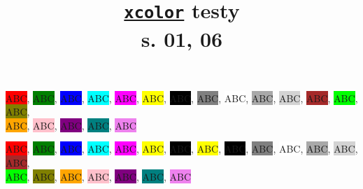 \documentclass[a4paper,11pt]{article}
\title{\href{https://repo.skni.umcs.pl/ctan/macros/latex/contrib/xcolor/xcolor.pdf}{\texttt{xcolor}} testy \\
  s. 01, 06}
\author{}
\begin{document}





\maketitle %





\noindent
\color{black}
\colorbox{red}{ABC},
\colorbox{green}{ABC},
\colorbox{blue}{ABC},
\colorbox{cyan}{ABC},
\colorbox{magenta}{ABC},
\colorbox{yellow}{ABC},
\color{white} \colorbox{black}{ABC}, \color{black}
\colorbox{gray}{ABC},
\colorbox{white}{ABC},
\colorbox{darkgray}{ABC},
\colorbox{lightgray}{ABC},
\colorbox{brown}{ABC},
\colorbox{lime}{ABC},
\colorbox{olive}{ABC}, \\[0.5em]
\colorbox{orange}{ABC},
\colorbox{pink}{ABC},
\colorbox{purple}{ABC},
\colorbox{teal}{ABC},
\colorbox{violet}{ABC}

\vspace{1em}





\begingroup

\color{black}


\noindent
\colorbox{red}{ABC},
\colorbox{green}{ABC},
\colorbox{blue}{ABC},
\colorbox{cyan}{ABC},
\colorbox{magenta}{ABC},
\colorbox{yellow}{ABC},
\colorbox{black}{ABC},
\colorbox{yellow}{ABC},
\colorbox{black}{ABC},
\colorbox{gray}{ABC},
\colorbox{white}{ABC},
\colorbox{darkgray}{ABC},
\colorbox{lightgray}{ABC},
\colorbox{brown}{ABC}, \\[0.5em]
\colorbox{lime}{ABC},
\colorbox{olive}{ABC},
\colorbox{orange}{ABC},
\colorbox{pink}{ABC},
\colorbox{purple}{ABC},
\colorbox{teal}{ABC},
\colorbox{violet}{ABC}

\endgroup











\end{document}
